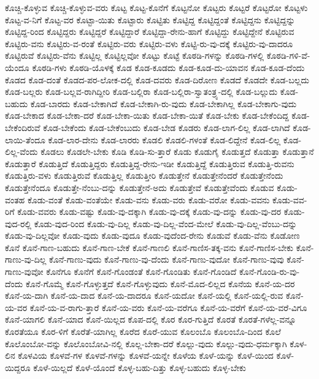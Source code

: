 {ಕೊಚ್ಚಿ-ಕೊಳ್ಳುವ
ಕೊಚ್ಚಿ-ಕೊಳ್ಳುವ-ವರು
ಕೊಟ್ಟ
ಕೊಟ್ಟ-ಕೊನೆಗೆ
ಕೊಟ್ಟನೋ
ಕೊಟ್ಟರು
ಕೊಟ್ಟರೆ
ಕೊಟ್ಟರೋ
ಕೊಟ್ಟಳು
ಕೊಟ್ಟ-ವ-ನಿಗೆ
ಕೊಟ್ಟ-ವರ
ಕೊಟ್ಟಾ-ಯಿತು
ಕೊಟ್ಟಾರು
ಕೊಟ್ಟಿತು
ಕೊಟ್ಟಿದ್ದ
ಕೊಟ್ಟಿದ್ದಂತೆ
ಕೊಟ್ಟಿದ್ದನು
ಕೊಟ್ಟಿದ್ದನ್ನು
ಕೊಟ್ಟಿದ್ದ-ರಿಂದ
ಕೊಟ್ಟಿದ್ದರು
ಕೊಟ್ಟಿದ್ದರೆ
ಕೊಟ್ಟಿದ್ದಾರೆ
ಕೊಟ್ಟಿದ್ದಾ-ರೇನು-ಹಾಗೆ
ಕೊಟ್ಟಿದ್ದು
ಕೊಟ್ಟಿದ್ದೇನೆ
ಕೊಟ್ಟಿರುವ
ಕೊಟ್ಟಿರು-ವನು
ಕೊಟ್ಟಿರು-ವ-ರಂತೆ
ಕೊಟ್ಟಿರು-ವರು
ಕೊಟ್ಟಿರು-ವಳು
ಕೊಟ್ಟಿ-ರು-ವು-ದಕ್ಕೆ
ಕೊಟ್ಟಿರು-ವು-ದಾದರೂ
ಕೊಟ್ಟಿರುವೆ
ಕೊಟ್ಟಿರು-ವೆನು
ಕೊಟ್ಟಿಲ್ಲ
ಕೊಟ್ಟಿಲ್ಲವೋ
ಕೊಟ್ಟು
ಕೊಟ್ಟೆ
ಕೊಠಡಿ-ಗಳನ್ನು
ಕೊಠಡಿ-ಗಳಲ್ಲಿ
ಕೊಠಡಿ-ಗಳಿ-ವೆ-ಯೆಂದೂ
ಕೊಠಡಿ-ಗಳು
ಕೊಠಡಿ-ಯೊಳಕ್ಕೆ
ಕೊಡ
ಕೊಡ-ಕೂಡದು
ಕೊಡ-ಕೂಡ-ದು-ಯಾವನ
ಕೊಡ-ಕೂಡ-ದೆಂದು
ಕೊಡದ
ಕೊಡ-ದಂತೆ
ಕೊಡದ-ಪರ-ಲೋಕ-ದಲ್ಲಿ
ಕೊಡ-ದವರು
ಕೊಡ-ದಿರೋಣ
ಕೊಡದೆ
ಕೊಡದೇ
ಕೊಡ-ಬಲ್ಲದು
ಕೊಡ-ಬಲ್ಲರು
ಕೊಡ-ಬಲ್ಲವ-ರಾಗಿದ್ದೀರಿ
ಕೊಡ-ಬಲ್ಲಿರಾ
ಕೊಡ-ಬಲ್ಲಿರಾ-ಸ್ವಾತಂತ್ರ್ಯ-ದಲ್ಲಿ
ಕೊಡ-ಬಲ್ಲುದು
ಕೊಡ-ಬಹುದು
ಕೊಡ-ಬಾರದು
ಕೊಡ-ಬೇಕಾಗಿದೆ
ಕೊಡ-ಬೇಕಾಗಿ-ರು-ವುದು
ಕೊಡ-ಬೇಕಾಗಿಲ್ಲ
ಕೊಡ-ಬೇಕಾಗು-ವುದು
ಕೊಡ-ಬೇಕಾದ
ಕೊಡ-ಬೇಕಾ-ದರೆ
ಕೊಡ-ಬೇಕಾ-ಯಿತು
ಕೊಡ-ಬೇಕಾ-ಯಿತೆ
ಕೊಡ-ಬೇಕು
ಕೊಡ-ಬೇಕೆಂದಿದ್ದ
ಕೊಡ-ಬೇಕೆಂದಿರುವೆ
ಕೊಡ-ಬೇಕೆಂದು
ಕೊಡ-ಬೇಕೆಂಬುದು
ಕೊಡ-ಬೇಡ
ಕೊಡರು
ಕೊಡ-ಲಾಗ-ಲಿಲ್ಲ
ಕೊಡ-ಲಾಗಿದೆ
ಕೊಡ-ಲಾಯಿ-ತೆಂದೂ
ಕೊಡ-ಲಾರ-ದೇನು
ಕೊಡ-ಲಾರರು
ಕೊಡಲಿ
ಕೊಡಲಿ-ಗಳಂತೆ
ಕೊಡ-ಲಿದ್ದೇನೆ
ಕೊಡ-ಲಿಲ್ಲ
ಕೊಡ-ಲಿಲ್ಲ-ವೆಂದು
ಕೊಡಲು
ಕೊಡಲೇ-ಬೇಕು
ಕೊಡಿ
ಕೊಡಿ-ಸು-ತ್ತಾರೆ
ಕೊಡು
ಕೊಡುಗೈ
ಕೊಡುತ್ತದೆ
ಕೊಡುತ್ತಾ
ಕೊಡುತ್ತಾನೆ
ಕೊಡುತ್ತಾರೆ
ಕೊಡುತ್ತಿದೆ
ಕೊಡುತ್ತಿದ್ದರು
ಕೊಡುತ್ತಿದ್ದ-ರೇನು-ಇಡೀ
ಕೊಡುತ್ತಿದ್ದೆ
ಕೊಡುತ್ತಿರುವ
ಕೊಡುತ್ತಿ-ರುವನು
ಕೊಡುತ್ತಿರು-ವಳು
ಕೊಡುತ್ತಿರುವೆ
ಕೊಡುತ್ತಿಲ್ಲ
ಕೊಡುತ್ತೀರಿ
ಕೊಡುತ್ತೇನೆ
ಕೊಡುತ್ತೇನೆಂದರೆ
ಕೊಡುತ್ತೇನೆಂದು
ಕೊಡುತ್ತೇನೆಂದೂ
ಕೊಡುತ್ತೇ-ನೆಂಬು-ದನ್ನು
ಕೊಡುತ್ತೇನೆ-ಅದು
ಕೊಡುತ್ತೇವೆ
ಕೊಡುತ್ತೇವೆಂದು
ಕೊಡುವ
ಕೊಡು-ವಂತಹ
ಕೊಡು-ವಂತೆ
ಕೊಡು-ವಂತೆಯೇ
ಕೊಡು-ವನು
ಕೊಡು-ವರು
ಕೊಡು-ವರೋ
ಕೊಡು-ವವನು
ಕೊಡು-ವವ-ರಿಗೆ
ಕೊಡು-ವವರು
ಕೊಡು-ವಷ್ಟು
ಕೊಡು-ವು-ದಕ್ಕಾಗಿ
ಕೊಡು-ವು-ದಕ್ಕೆ
ಕೊಡು-ವು-ದನ್ನು
ಕೊಡು-ವು-ದರ
ಕೊಡು-ವುದ-ರಲ್ಲಿ
ಕೊಡು-ವುದ-ರಿಂದ
ಕೊಡು-ವು-ದಿಲ್ಲ
ಕೊಡು-ವು-ದಿಲ್ಲ-ವೆಂದ-ಮೇಲೆ
ಕೊಡು-ವು-ದಿಲ್ಲ-ವೆಂಬು-ದನ್ನು
ಕೊಡು-ವು-ದಿಲ್ಲವೋ
ಕೊಡು-ವುದು
ಕೊಡು-ವುದೂ
ಕೊಡು-ವುದೆಂದ-ರೇನು
ಕೊಡುವೆ
ಕೊಡು-ವೆನು
ಕೊಡೋಣ
ಕೊನೆ
ಕೊನೆ-ಗಾಣ-ಬಹುದು
ಕೊನೆ-ಗಾಣ-ಬೇಕೆ
ಕೊನೆ-ಗಾಣಲಿ
ಕೊನೆ-ಗಾಣಿಸ-ತಕ್ಕ-ವನು
ಕೊನೆ-ಗಾಣಿಸ-ಬೇಕು
ಕೊನೆ-ಗಾಣು-ವು-ದಿಲ್ಲ
ಕೊನೆ-ಗಾಣು-ವುದು
ಕೊನೆ-ಗಾಣು-ವು-ದೆಂದು
ಕೊನೆ-ಗಾಣು-ವುದೋ
ಕೊನೆ-ಗಾಣು-ವುವು
ಕೊನೆ-ಗಾಣು-ವುವೋ
ಕೊನೆಗೂ
ಕೊನೆಗೆ
ಕೊನೆ-ಗೊಂಡಂತೆ
ಕೊನೆ-ಗೊಂಡಿತು
ಕೊನೆ-ಗೊಂಡಿದೆ
ಕೊನೆ-ಗೊಂಡಿ-ರು-ವು-ದೆಂದು
ಕೊನೆ-ಗೊಮ್ಮೆ
ಕೊನೆ-ಗೊಳ್ಳುತ್ತದೆ
ಕೊನೆ-ಗೊಳ್ಳುವುದು
ಕೊನೆ-ಮೊದ-ಲಿಲ್ಲದ
ಕೊನೆಯ
ಕೊನೆ-ಯ-ದರ
ಕೊನೆ-ಯ-ದಾಗಿ
ಕೊನೆ-ಯ-ದಾದ
ಕೊನೆ-ಯ-ದಾದರೂ
ಕೊನೆ-ಯದೋ
ಕೊನೆ-ಯಲ್ಲಿ
ಕೊನೆ-ಯಲ್ಲಿ-ರುವ
ಕೊನೆ-ಯ-ವರ
ಕೊನೆ-ಯ-ವ-ರಾಗು-ತ್ತಾರೆ
ಕೊನೆ-ಯ-ವರು
ಕೊನೆ-ಯ-ವರೆಗೂ
ಕೊನೆ-ಯ-ವರೆಗೆ
ಕೊನೆ-ಯ-ವರೆ-ವಿಗೂ
ಕೊನೆ-ಯಾಗಲಿ
ಕೊನೆ-ಯಾದ
ಕೊನೆ-ಯಿಲ್ಲದ
ಕೊಪ-ದಲ್ಲಿ
ಕೊರ
ಕೊರ-ಗುತ್ತಿದೆ
ಕೊರತೆ
ಕೊರತೆ-ಗಳೆಲ್ಲ-ವನ್ನೂ
ಕೊರತೆಯೂ
ಕೊರ-ಳಿಗೆ
ಕೊರೆತೆ-ಯಾಗಿಲ್ಲ
ಕೊರೆದ
ಕೊರೆ-ಯುವ
ಕೊಲಂಬೊ
ಕೊಲಂಬೊ-ದಿಂದ
ಕೊಲೆ
ಕೊಲೊಂಬೋ-ವನ್ನು
ಕೊಲೊಂಬೋವಿ-ನಲ್ಲಿ
ಕೊಲ್ಲ-ಬೇಕಾ-ದರೆ
ಕೊಲ್ಲು-ವುದು
ಕೊಲ್ಲು-ವುದು-ಧರ್ಮಕ್ಕಾಗಿ
ಕೊಳ-ಲಿನ
ಕೊಳವಿಯ
ಕೊಳವೆ-ಗಳ
ಕೊಳವೆ-ಗಳನ್ನು
ಕೊಳವೆ-ಯನ್ನೇ
ಕೊಳೆಯ
ಕೊಳೆ-ಯನ್ನು
ಕೊಳೆ-ಯಿಂದ
ಕೊಳೆ-ಯಿದ್ದರೂ
ಕೊಳೆ-ಯಿಲ್ಲದೆ
ಕೊಳೆ-ಯೊಂದೆ
ಕೊಳ್ಳ-ಬಹು-ದಿತ್ತು
ಕೊಳ್ಳ-ಬಹುದು
ಕೊಳ್ಳ-ಬೇಕು
}
